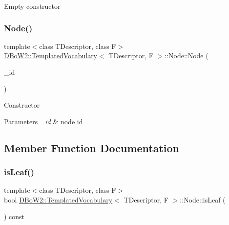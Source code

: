 Empty constructor \mbox{\label{structDBoW2_1_1TemplatedVocabulary_1_1Node_a9f1fcb620025ba6103a47e5c2b169cd6}} 
\subsubsection{\texorpdfstring{Node()}{Node()}\hspace{0.1cm}{\footnotesize\ttfamily [2/2]}}
{\footnotesize\ttfamily template$<$class T\+Descriptor, class F$>$ \\
\hyperlink{classDBoW2_1_1TemplatedVocabulary}{D\+Bo\+W2\+::\+Templated\+Vocabulary}$<$ T\+Descriptor, F $>$\+::Node\+::\+Node (\begin{DoxyParamCaption}\item[{\hyperlink{namespaceDBoW2_a3a0fa9c50c0df508759362d6204566f2}{Node\+Id}}]{\+\_\+id }\end{DoxyParamCaption})\hspace{0.3cm}{\ttfamily [inline]}}

Constructor 
\begin{DoxyParams}{Parameters}
{\em \+\_\+id} & node id \\
\hline
\end{DoxyParams}


\subsection{Member Function Documentation}
\mbox{\label{structDBoW2_1_1TemplatedVocabulary_1_1Node_a050a0ee173dd58475dd2ab84e6f215e8}} 
\subsubsection{\texorpdfstring{is\+Leaf()}{isLeaf()}}
{\footnotesize\ttfamily template$<$class T\+Descriptor, class F$>$ \\
bool \hyperlink{classDBoW2_1_1TemplatedVocabulary}{D\+Bo\+W2\+::\+Templated\+Vocabulary}$<$ T\+Descriptor, F $>$\+::Node\+::is\+Leaf (\begin{DoxyParamCaption}{ }\end{DoxyParamCaption}) const\hspace{0.3cm}{\ttfamily [inline]}}

